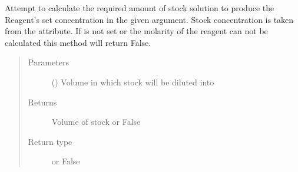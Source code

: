\documentclass[letterpaper,10pt,english]{sphinxmanual}
\begin{document}
\begin{fulllineitems}
\begin{fulllineitems}
\label{\detokenize{polo.crystallography:polo.crystallography.cocktail.Reagent.stock_volume}}
Attempt to calculate the required amount of stock solution to
produce the Reagent’s set concentration in the given 
argument. Stock concentration is taken from the 
 attribute. If
 is not
set or the molarity of the reagent can not be calculated this method
will return False.
\begin{quote}\begin{description}
\item[{Parameters}] \leavevmode
{} ({\hyperref[\detokenize{polo.crystallography:polo.crystallography.cocktail.UnitValue}]{}}) \textendash{} Volume in which stock will be diluted into

\item[{Returns}] \leavevmode
Volume of stock or False

\item[{Return type}] \leavevmode
{\hyperref[\detokenize{polo.crystallography:polo.crystallography.cocktail.UnitValue}]{}} or False

\end{description}\end{quote}

\end{fulllineitems}


\begin{fulllineitems}
\label{\detokenize{polo.crystallography:polo.crystallography.cocktail.Reagent.units}}
\end{fulllineitems}


\end{fulllineitems}

\end{document}
